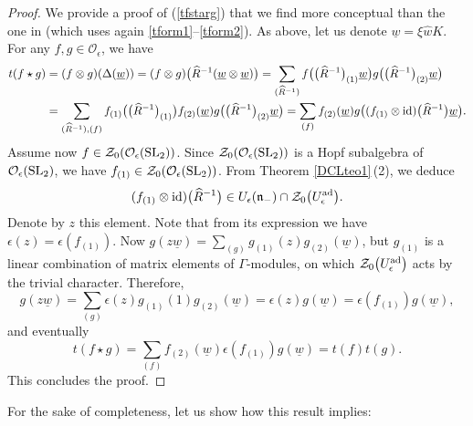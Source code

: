 \documentclass[10pt,a4paper]{amsart}
\numberwithin{equation}{section}
\theoremstyle{definition}
\newcommand{\e}{\epsilon}
\newcommand{\Oo}{{\mathcal O}}
\begin{document}
\begin{proof}
We provide a proof of (\ref{tfstarg}) that we find more conceptual than the one in \cite[Lemma~1.5\,(b)]{DC-L} (which uses again \eqref{tform1}--\eqref{tform2}). As above, let us denote $\underline{w}=\xi \hat{w}K$. For any $f,g\in {\mathcal O}_\epsilon$, we have
\begin{align*}
 t(f\star g)& =(f\otimes g)(\Delta(\underline{w}))=(f\otimes g)\big(\widehat{R}^{-1} (\underline{w} \otimes \underline{w})\big)=\sum_{(\widehat{R}^{-1}) }f\big( \big( \widehat{R}^{-1}\big)_{(1) } \underline{w} \big) g\big( \big( \widehat{R}^{-1}\big)_{(2) } \underline{w}\big)\\
&=\sum_{(\widehat{R}^{-1}),(f) }f_{(1)}\big( \big( \widehat{R}^{-1}\big)_{(1) } \big) f_{(2)}(\underline{w} ) g\big( \big( \widehat{R}^{-1}\big)_{(2) } \underline{w}\big)=\sum_{(f) }f_{(2)}(\underline{w} ) g\big( (f_{(1)}\otimes {\rm id} )\big(\widehat{R}^{-1}\big) \underline{w}\big).
\end{align*}
Assume now $f\in \mathcal{Z}_0(\Oo_\e({\rm SL}_2))$. Since $\mathcal{Z}_0(\Oo_\e({\rm SL}_2))$ is a Hopf subalgebra of ${\mathcal O}_{\epsilon}({\rm SL}_2)$, we have \linebreak ${f_{(1)}\in \mathcal{Z}_0(\Oo_\e({\rm SL}_2))}$. From Theorem \ref{DCLteo1}\,(2), we deduce
\[(f_{(1)}\otimes {\rm id} )\big(\widehat{R}^{-1}\big) \in U_\epsilon (\mathfrak{n}_-)\cap \mathcal{Z}_0\big(U_\epsilon^{\rm ad}\big).\]
Denote by $z$ this element. Note that from its expression we have $\epsilon(z)= \epsilon(f_{(1)})$. Now
 $g( z\underline{w})=\sum_{(g)}g_{(1)}(z)g_{(2)}(\underline{w})$, but $g_{(1)}$ is a linear combination of matrix elements of $\Gamma$-modules, on which ${\mathcal Z}_0\big(U_\epsilon^{\rm ad}\big)$ acts by the trivial character. Therefore,
\[ g( z\underline{w})=\sum_{(g)}\epsilon(z)g_{(1)}(1)g_{(2)}(\underline{w})=\epsilon(z)g(\underline{w})= \epsilon(f_{(1)})g(\underline{w}),\]
and eventually
 \[t(f\star g)=\sum_{(f) }f_{(2)}(\underline{w}) \epsilon(f_{(1)}) g(\underline{w})=t(f)t(g).\]
This concludes the proof.
\end{proof}


For the sake of completeness, let us show how this result implies:
\end{document}
